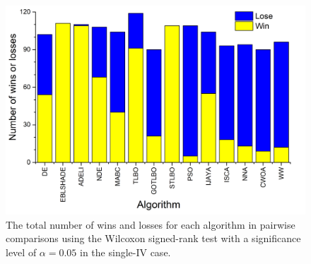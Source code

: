 \documentclass[a4paper,fleqn]{cas-dc}
\begin{document}
\begin{figure}[]
	\centering
		\includegraphics[width=1.0\columnwidth]{Fig5}
	  \caption{The total number of wins and losses for each algorithm in pairwise comparisons using the 
               Wilcoxon signed-rank test with a significance level of $\alpha = 0.05$ in the single-IV case.}\label{figWilTotSingleIV}
\end{figure}
\end{document}
